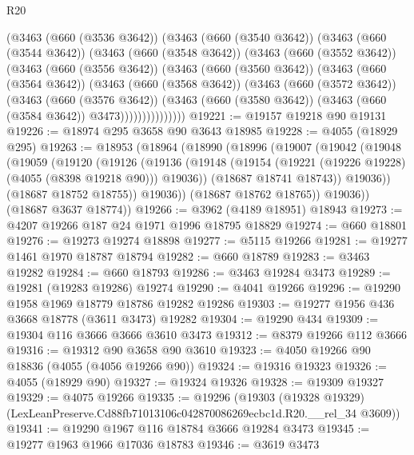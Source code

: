 \begin{lexlean}{R20}
\begin{coremodule}
        (@3463
          (@660 (@3536 @3642))
          (@3463
            (@660 (@3540 @3642))
            (@3463
              (@660 (@3544 @3642))
              (@3463
                (@660 (@3548 @3642))
                (@3463
                  (@660 (@3552 @3642))
                  (@3463
                    (@660 (@3556 @3642))
                    (@3463
                      (@660 (@3560 @3642))
                      (@3463
                        (@660 (@3564 @3642))
                        (@3463
                          (@660 (@3568 @3642))
                          (@3463
                            (@660 (@3572 @3642))
                            (@3463
                              (@660 (@3576 @3642))
                              (@3463
                                (@660 (@3580 @3642))
                                (@3463 (@660 (@3584 @3642)) @3473)))))))))))))))
@19221 := @19157 @19218 @90 @19131
@19226 := @18974 @295 @3658 @90 @3643 @18985
@19228 := @4055 (@18929 @295)
@19263 := @18953
    (@18964
      (@18990
        (@18996
          (@19007
            (@19042
              (@19048
                (@19059
                  (@19120
                    (@19126
                      (@19136
                        (@19148 (@19154 (@19221 (@19226 @19228) (@4055 (@8398 @19218 @90))) @19036))
                        (@18687 @18741 @18743))
                      @19036))
                  (@18687 @18752 @18755))
                @19036))
            (@18687 @18762 @18765))
          @19036))
      (@18687 @3637 @18774))
@19266 := @3962 (@4189 @18951) @18943
@19273 := @4207 @19266 @187 @24 @1971 @1996 @18795 @18829
@19274 := @660 @18801
@19276 := @19273 @19274 @18898
@19277 := @5115 @19266
@19281 := @19277 @1461 @1970 @18787 @18794
@19282 := @660 @18789
@19283 := @3463 @19282
@19284 := @660 @18793
@19286 := @3463 @19284 @3473
@19289 := @19281 (@19283 @19286) @19274
@19290 := @4041 @19266
@19296 := @19290 @1958 @1969 @18779 @18786 @19282 @19286
@19303 := @19277 @1956 @436 @3668 @18778 (@3611 @3473) @19282
@19304 := @19290 @434
@19309 := @19304 @116 @3666 @3666 @3610 @3473
@19312 := @8379 @19266 @112 @3666
@19316 := @19312 @90 @3658 @90 @3610
@19323 := @4050 @19266 @90 @18836 (@4055 (@4056 @19266 @90))
@19324 := @19316 @19323
@19326 := @4055 (@18929 @90)
@19327 := @19324 @19326
@19328 := @19309 @19327
@19329 := @4075 @19266
@19335 := @19296
    (@19303 (@19328 @19329) (LexLeanPreserve.Cd88fb71013106c042870086269ecbc1d.R20.__rel_34 @3609))
@19341 := @19290 @1967 @116 @18784 @3666 @19284 @3473
@19345 := @19277 @1963 @1966 @17036 @18783
@19346 := @3619 @3473

\end{coremodule}
\end{lexlean}
